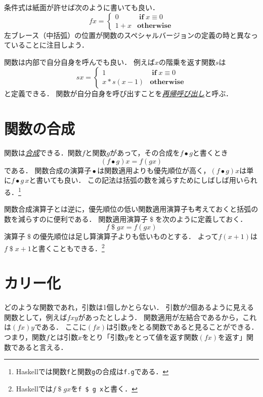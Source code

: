 \documentclass[twocolumn]{jsbook}
\newcommand{\keyword}[1]{\underline{\emph{#1}}}
\newcommand{\code}[1]{\texttt{#1}}
\newcommand{\mathKeyword}[1]{\mathbf{#1}}
\DeclareMathOperator{\mathApply}{\$}
\DeclareMathOperator{\mathCompose}{\bullet}
\DeclareMathOperator{\mathIf}{\mathKeyword{if}}
\newcommand{\mathOtherwise}{\mathKeyword{otherwise}}
\begin{document}
条件式は紙面が許せば次のように書いても良い．
\begin{equation*}
fx=\begin{cases}
0&\mathIf x\equiv0\\
1+x&\mathOtherwise
\end{cases}
\end{equation*}
左ブレース（中括弧）の位置が関数のスペシャルバージョンの定義の時と異なっていることに注目しよう．

関数は内部で自分自身を呼んでも良い．
例えば$x$の階乗を返す関数$s$は
\begin{equation*}
sx=\begin{cases}
1&\mathIf x\equiv0\\
x*s(x-1)&\mathOtherwise
\end{cases}
\end{equation*}
と定義できる．
関数が自分自身を呼び出すことを\keyword{再帰呼び出し}と呼ぶ．

\section{関数の合成}

関数は\keyword{合成}できる．関数$f$と関数$g$があって，その合成を$f\mathCompose g$と書くとき$$(f\mathCompose g)x=f(gx)$$である．
関数合成の演算子$\mathCompose$は関数適用よりも優先順位が高く，$(f\mathCompose g)x$は単に$f\mathCompose g\,x$と書いても良い．
この記法は括弧の数を減らすためにしばしば用いられる．\footnote{Haskellでは関数\code{f}と関数\code{g}の合成は\code{f.g}である．}

関数合成演算子とは逆に，優先順位の低い関数適用演算子も考えておくと括弧の数を減らすのに便利である．
関数適用演算子$\mathApply$を次のように定義しておく．
$$f\mathApply gx=f(gx)$$
演算子$\mathApply$の優先順位は足し算演算子よりも低いものとする．
よって$f(x+1)$は$f\mathApply x+1$と書くこともできる．\footnote{Haskellでは$f\mathApply gx$を\code{f \$ g x}と書く．}

\section{カリー化}

どのような関数であれ，引数は1個しかとらない．
引数が2個あるように見える関数として，例えば$fxy$があったとしよう．
関数適用が左結合であるから，これは$(fx)y$である．
ここに$(fx)$は引数$y$をとる関数であると見ることができる．
つまり，関数$f$とは引数$x$をとり「引数$y$をとって値を返す関数$(fx)$を返す」関数であると言える．
\end{document}

